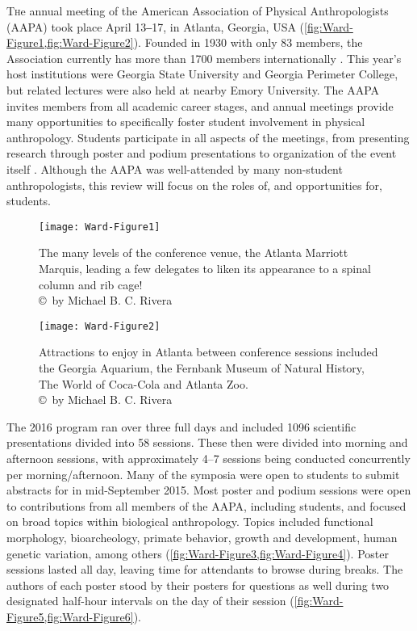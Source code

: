 \documentclass[english]{ijsra}
\def\authortwo{Michael B. C. Rivera}
\begin{document}
\IJSRAopening%


\lettrine{T}he  annual meeting of the American Association of Physical Anthropologists (AAPA)
took place April 13‒17, in Atlanta, Georgia, USA (\cref{fig:Ward-Figure1,fig:Ward-Figure2}).
Founded in 1930 with only \num{83} members, the Association currently has more than \num{1700} members internationally \parencite{american2016}.
This year’s host institutions were Georgia State University and Georgia Perimeter College,
but related lectures were also held at nearby Emory University.
The AAPA invites members from all academic career stages, and annual meetings provide many opportunities to
specifically foster student involvement in physical anthropology.
Students participate in all aspects of the meetings, from presenting research through poster and
podium presentations to organization of the event itself \parencite{beasley2016}.
Although the AAPA was well-attended by many non-student anthropologists, this review will focus on the roles of,
and opportunities for, students.
\begin{figure}[!htb] %
		\centering
		\texttt{[image: Ward-Figure1]}
		\caption{The many levels of the conference venue, the Atlanta Marriott Marquis, leading a few delegates to liken its appearance to a spinal column and rib cage! 
		{\normalfont\scriptsize \\ \copyright\ by \authortwo}}
		\label{fig:Ward-Figure1}
	\end{figure}

\begin{figure}[!htb] %
		\centering
		\texttt{[image: Ward-Figure2]}
		\caption{Attractions to enjoy in Atlanta between conference sessions included the Georgia Aquarium, the Fernbank Museum of Natural History, The World of Coca-Cola and Atlanta Zoo. 
		{\normalfont\scriptsize \\ \copyright\ by \authortwo}}
		\label{fig:Ward-Figure2}
	\end{figure}
The 2016 program ran over three full days and included \num{1096} scientific presentations divided into 58 sessions.
These then were divided into morning and afternoon sessions, 
with approximately 4--7 sessions being conducted concurrently per morning/afternoon. 
Many of the symposia were open to students to submit abstracts for in mid-September 2015.
Most poster and podium sessions were open to contributions from all members of the AAPA, including students,
and focused on broad topics within biological anthropology.
Topics included functional morphology, bioarcheology, primate behavior, growth and development, human genetic variation,
among others (\cref{fig:Ward-Figure3,fig:Ward-Figure4}).
Poster sessions lasted all day, leaving time for attendants to browse during breaks.
The authors of each poster stood by their posters for questions as well during two designated half-hour intervals on
the day of their session (\cref{fig:Ward-Figure5,fig:Ward-Figure6}).
\end{document}
